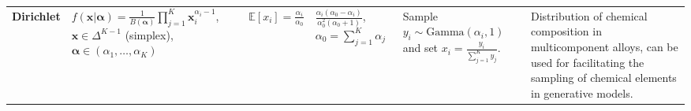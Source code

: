 \begin{longtable}{p{2cm}
    >{\raggedright\arraybackslash}p{3.5cm}
    >{\raggedright\arraybackslash}p{1.0cm}
    >{\raggedright\arraybackslash}p{2cm}
    >{\raggedright\arraybackslash}p{2.5cm}
    p{6cm}}
\footnotesize{\textbf{Dirichlet}} 
& \footnotesize{$f(\bm{x}|\bm{\alpha})=\frac{1}{B(\bm{\alpha})}\prod_{j=1}^{K} \bm{x}_i^{\alpha_i -1}$, $\bm{x}\in\Delta^{K-1}$ (simplex), $\bm{\alpha}\in (\alpha_1,\ldots,\alpha_K)$}
& \footnotesize{$\mathbb{E}[x_i]=\frac{\alpha_i}{\alpha_0}$}
& \footnotesize{$\frac{\alpha_i(\alpha_0-\alpha_i)}{\alpha_0^2(\alpha_0+1)}$, $\alpha_0=\sum_{j=1}^{K} \alpha_j$}
& \footnotesize{Sample $y_i\sim\mbox{Gamma}(\alpha_i,1)$ and set $x_i=\frac{y_i}{\sum_{j=1}^{K} y_j}$.}
& \footnotesize{Distribution of chemical composition in multicomponent alloys,\cite{clausen2023ab} can be used for facilitating the sampling of chemical elements in generative models.}\\ 
\end{longtable}